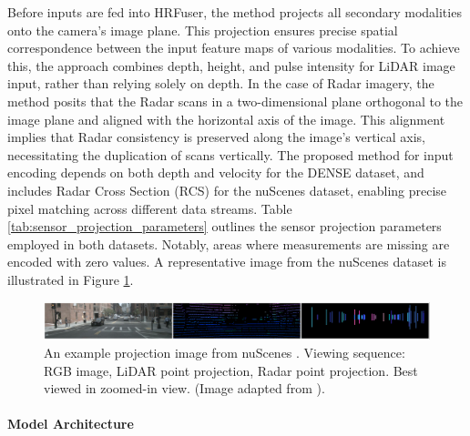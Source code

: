 \documentclass[report.tex]{subfiles}
\begin{document}
    Before inputs are fed into HRFuser, the method projects all secondary modalities onto the camera's image plane. This projection ensures precise spatial correspondence between the input feature maps of various modalities. To achieve this, the approach combines depth, height, and pulse intensity for LiDAR image input, rather than relying solely on depth. In the case of Radar imagery, the method posits that the Radar scans in a two-dimensional plane orthogonal to the image plane and aligned with the horizontal axis of the image. This alignment implies that Radar consistency is preserved along the image's vertical axis, necessitating the duplication of scans vertically. The proposed method for input encoding depends on both depth and velocity for the DENSE dataset, and includes Radar Cross Section (RCS) for the nuScenes dataset, enabling precise pixel matching across different data streams. Table \ref{tab:sensor_projection_parameters} outlines the sensor projection parameters employed in both datasets. Notably, areas where measurements are missing are encoded with zero values. A representative image from the nuScenes dataset is illustrated in Figure \ref{fig:hrfuser_projection_image}.


    

    \begin{figure}[h]
        \centering
        \includegraphics[width=1.0\textwidth]{images/methods/hrfuser/sample_projection_image.png}
        \caption{An example projection image from nuScenes \cite{caesar2020nuscenes}. Viewing sequence: RGB image, LiDAR point projection, Radar point projection. Best viewed in zoomed-in view. (Image adapted from \cite{broedermann2022hrfuser}).}
        \label{fig:hrfuser_projection_image}
    \end{figure}


    \paragraph*{Model Architecture}

    
\end{document}
